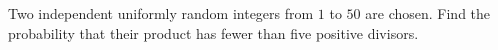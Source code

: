 Two independent uniformly random integers from $1$ to $50$ are chosen. Find the probability that their product has fewer than five positive divisors.
